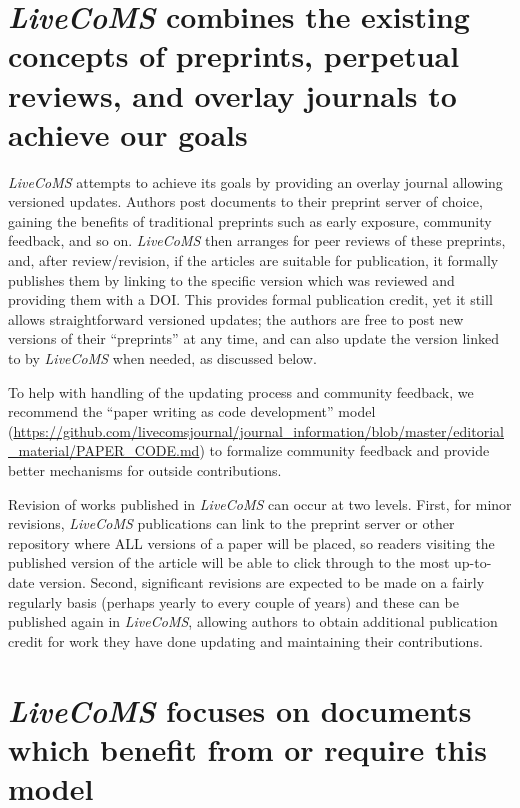 \documentclass[9pt]{livecoms}
\begin{document}
\section{\emph{LiveCoMS} combines the existing concepts of preprints, perpetual reviews, and overlay journals to achieve our goals}

\emph{LiveCoMS} attempts to achieve its goals by providing an overlay journal allowing versioned updates.
Authors post documents to their preprint server of choice, gaining the benefits of traditional preprints such as early exposure, community feedback, and so on. 
\emph{LiveCoMS} then arranges for peer reviews of these preprints, and, after review/revision, if the articles are suitable for publication, it formally publishes them by linking to the specific version which was reviewed and providing them with a DOI.
This provides formal publication credit, yet it still allows straightforward versioned updates; the authors are free to post new versions of their ``preprints'' at any time, and can also update the version linked to by \emph{LiveCoMS} when needed, as discussed below.

To help with handling of the updating process and community feedback, we recommend the ``paper writing as code development'' model (\url{https://github.com/livecomsjournal/journal_information/blob/master/editorial_material/PAPER_CODE.md}) to formalize community feedback and provide better mechanisms for outside contributions. 

Revision of works published in \emph{LiveCoMS} can occur at two levels. 
First, for minor revisions, \emph{LiveCoMS} publications can link to the preprint server or other repository where ALL versions of a paper will be placed, so readers visiting the published version of the article will be able to click through to the most up-to-date version.
Second, significant revisions are expected to be made on a fairly regularly basis (perhaps yearly to every couple of years) and these can be published again in \emph{LiveCoMS}, allowing authors to obtain additional publication credit for work they have done updating and maintaining their contributions. 

\section{\emph{LiveCoMS} focuses on documents which benefit from or require this model}
\end{document}
